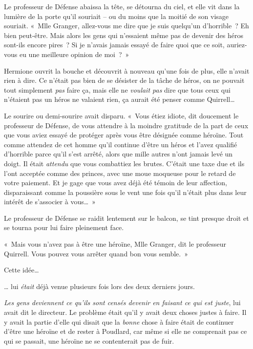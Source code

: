 Le professeur de Défense abaissa la tête, se détourna du ciel, et elle vit dans la lumière de la porte qu'il souriait -- ou du moins que la moitié de son visage souriait.
«~Mlle Granger, allez-vous me dire que je suis quelqu'un d'horrible~?
Eh bien peut-être.
Mais alors les gens qui n'essaient même pas de devenir des héros sont-ils encore pires~?
Si je n'avais jamais essayé de faire quoi que ce soit, auriez-vous eu une meilleure opinion de moi~?~»

Hermione ouvrit la bouche et découvrit à nouveau qu'une fois de plus, elle n'avait rien à dire.
Ce n'était pas bien de se désister de la tâche de héros, on ne pouvait tout simplement \emph{pas} faire ça, mais elle ne \emph{voulait pas} dire que tous ceux qui n'étaient pas un héros ne valaient rien, ça aurait été penser comme Quirrell…

Le sourire ou demi-sourire avait disparu.
«~Vous étiez idiote, dit doucement le professeur de Défense, de vous attendre à la moindre gratitude de la part de ceux que vous aviez essayé de protéger après vous être désignée comme héroïne.
Tout comme attendez de cet homme qu'il continue d'être un héros et l'avez qualifié d'horrible parce qu'il s'est arrêté, alors que mille autres n'ont jamais levé un doigt.
Il était \emph{attendu} que vous combattiez les brutes.
C'était une taxe due et ils l'ont acceptée comme des princes, avec une moue moqueuse pour le retard de votre paiement.
Et je gage que vous avez déjà été témoin de leur affection, disparaissant comme la poussière sous le vent une fois qu'il n'était plus dans leur intérêt de s'associer à vous…~»

Le professeur de Défense se raidit lentement sur le balcon, se tint presque droit et se tourna pour lui faire pleinement face.

«~Mais vous n'avez pas à être une héroïne, Mlle Granger, dit le professeur Quirrell.
Vous pouvez vous arrêter quand bon vous semble.~»

Cette idée…

… lui \emph{était} déjà venue plusieurs fois lors des deux derniers jours.

\emph{Les gens deviennent ce qu'ils sont censés devenir en faisant ce qui est juste}, lui avait dit le directeur.
Le problème était qu'il y avait deux choses justes à faire.
Il y avait la partie d'elle qui disait que la \emph{bonne} chose à faire était de continuer d'être une héroïne et de rester à Poudlard, car même si elle ne comprenait pas ce qui se passait, une héroïne ne se contenterait pas de fuir.

